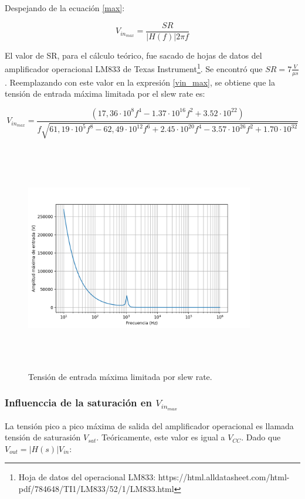 Despejando de la ecuaci\'on \ref{max}:

\begin{equation}
V_{in_{max}}  = \frac{SR}{\rvert H(f)\rvert 2\pi f}
\label{vinmax}
\end{equation}

El valor de SR, para el c\'alculo te\'orico, fue sacado de hojas de datos del amplificador operacional LM833 de Texas Instrument\footnote{Hoja de datos del operacional LM833: https://html.alldatasheet.com/html-pdf/784648/TI1/LM833/52/1/LM833.html}. 
Se encontr\'o que $SR = 7 \frac{V}{\mu s}$. Reemplazando con este valor en la expresi\'on \ref{vin_max}, se obtiene que la tensi\'on de entrada m\'axima limitada por el slew rate es:

\begin{equation}
V_{in_{max}}  = \frac{\left(17,36 \cdot 10^8 f^{4} - 1.37 \cdot 10^{16} f^{2} + 3.52 \cdot 10^{22}\right)}{f \sqrt{61,19 \cdot 10^5 f^{8} - 62,49 \cdot 10^{12} f^{6} + 2.45 \cdot 10^{20} f^{4} - 3.57 \cdot 10^{26} f^{2} + 1.70 \cdot 10^{32}}}		
\label{vin_max}
\end{equation}


\begin{figure}[H] %
	\centering
	\includegraphics[width=10cm,height=10cm,keepaspectratio]{../EJ1/00GRAFICOS/vinmaxsr.png}
	\caption{Tensi\'on de entrada m\'axima limitada por slew rate.}
	\label{vinmaxsr}
\end{figure}

\subsubsection{Influenccia de la saturaci\'on en $V_{in_{max}}$}
La tensi\'on pico a pico m\'axima de salida del amplificador operacional es llamada 
tensi\'on de saturasi\'on $V_{sat}$. Te\'oricamente, este valor es igual a $V_{CC}$. Dado que $V_{out} = \rvert H(s) \rvert V_{in}$:

